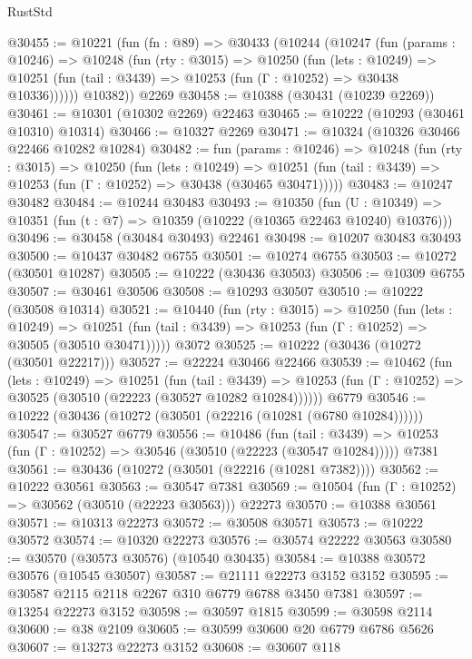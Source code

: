 \begin{lexlean}{RustStd}
\begin{coremodule}
@30455 := @10221
    (fun (fn : @89) =>
    @30433
      (@10244
        (@10247
          (fun (params : @10246) =>
          @10248
            (fun (rty : @3015) =>
            @10250
              (fun (lets : @10249) =>
              @10251 (fun (tail : @3439) => @10253 (fun (Γ : @10252) => @30438 @10336))))))
        @10382))
    @2269
@30458 := @10388 (@30431 (@10239 @2269))
@30461 := @10301 (@10302 @2269) @22463
@30465 := @10222 (@10293 (@30461 @10310) @10314)
@30466 := @10327 @2269
@30471 := @10324 (@10326 @30466 @22466 @10282 @10284)
@30482 := fun (params : @10246) =>
  @10248
    (fun (rty : @3015) =>
    @10250
      (fun (lets : @10249) =>
      @10251 (fun (tail : @3439) => @10253 (fun (Γ : @10252) => @30438 (@30465 @30471)))))
@30483 := @10247 @30482
@30484 := @10244 @30483
@30493 := @10350
    (fun (U : @10349) => @10351 (fun (t : @7) => @10359 (@10222 (@10365 @22463 @10240) @10376)))
@30496 := @30458 (@30484 @30493) @22461
@30498 := @10207 @30483 @30493
@30500 := @10437 @30482 @6755
@30501 := @10274 @6755
@30503 := @10272 (@30501 @10287)
@30505 := @10222 (@30436 @30503)
@30506 := @10309 @6755
@30507 := @30461 @30506
@30508 := @10293 @30507
@30510 := @10222 (@30508 @10314)
@30521 := @10440
    (fun (rty : @3015) =>
    @10250
      (fun (lets : @10249) =>
      @10251 (fun (tail : @3439) => @10253 (fun (Γ : @10252) => @30505 (@30510 @30471)))))
    @3072
@30525 := @10222 (@30436 (@10272 (@30501 @22217)))
@30527 := @22224 @30466 @22466
@30539 := @10462
    (fun (lets : @10249) =>
    @10251
      (fun (tail : @3439) =>
      @10253 (fun (Γ : @10252) => @30525 (@30510 (@22223 (@30527 @10282 @10284))))))
    @6779
@30546 := @10222 (@30436 (@10272 (@30501 (@22216 (@10281 (@6780 @10284))))))
@30547 := @30527 @6779
@30556 := @10486
    (fun (tail : @3439) => @10253 (fun (Γ : @10252) => @30546 (@30510 (@22223 (@30547 @10284)))))
    @7381
@30561 := @30436 (@10272 (@30501 (@22216 (@10281 @7382))))
@30562 := @10222 @30561
@30563 := @30547 @7381
@30569 := @10504 (fun (Γ : @10252) => @30562 (@30510 (@22223 @30563))) @22273
@30570 := @10388 @30561
@30571 := @10313 @22273
@30572 := @30508 @30571
@30573 := @10222 @30572
@30574 := @10320 @22273
@30576 := @30574 @22222 @30563
@30580 := @30570 (@30573 @30576) (@10540 @30435)
@30584 := @10388 @30572 @30576 (@10545 @30507)
@30587 := @21111 @22273 @3152 @3152
@30595 := @30587 @2115 @2118 @2267 @310 @6779 @6788 @3450 @7381
@30597 := @13254 @22273 @3152
@30598 := @30597 @1815
@30599 := @30598 @2114
@30600 := @38 @2109
@30605 := @30599 @30600 @20 @6779 @6786 @5626
@30607 := @13273 @22273 @3152
@30608 := @30607 @118

\end{coremodule}
\end{lexlean}
